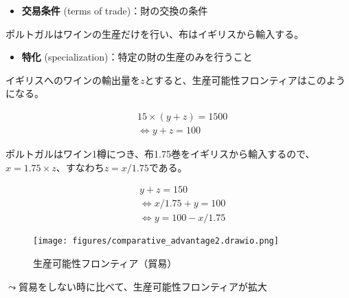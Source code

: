 \documentclass[
  xelatex,
  ja=standard]{bxjsarticle}
\providecommand{\tightlist}{%
  \setlength{\itemsep}{0pt}\setlength{\parskip}{0pt}}\usepackage{longtable,booktabs,array}
\begin{document}
\begin{itemize}
\tightlist
\item
  \textbf{交易条件} (terms of trade)：財の交換の条件
\end{itemize}

\begin{tcolorbox}[enhanced jigsaw, left=2mm, colframe=quarto-callout-tip-color-frame, colback=white, coltitle=black, rightrule=.15mm, title=\textcolor{quarto-callout-tip-color}{\faLightbulb}\hspace{0.5em}{イギリスとポルトガルの貿易'\,'\,'}, arc=.35mm, toprule=.15mm, bottomrule=.15mm, leftrule=.75mm, bottomtitle=1mm, toptitle=1mm, titlerule=0mm, breakable, opacitybacktitle=0.6, colbacktitle=quarto-callout-tip-color!10!white, opacityback=0]

ポルトガルはワインの生産だけを行い、布はイギリスから輸入する。

\end{tcolorbox}

\begin{itemize}
\tightlist
\item
  \textbf{特化} (specialization)：特定の財の生産のみを行うこと
\end{itemize}

イギリスへのワインの輸出量を\(z\)とすると、生産可能性フロンティアはこのようになる。

\[
\begin{split}
& 15 \times (y + z) = 1500 \\
& \Leftrightarrow y + z = 100
\end{split}
\]

ポルトガルはワイン1樽につき、布1.75巻をイギリスから輸入するので、\(x = 1.75 \times z\)、すなわち\(z = x/1.75\)である。

\[
\begin{split}
& y + z = 150 \\
& \Leftrightarrow x/1.75 + y = 100 \\
& \Leftrightarrow y = 100 - x/1.75
\end{split}
\]

\begin{figure}[htpb]

{\centering \texttt{[image: figures/comparative\_advantage2.drawio.png]}

}

\caption{生産可能性フロンティア（貿易）}

\end{figure}

\(\leadsto\)貿易をしない時に比べて、生産可能性フロンティアが拡大
\end{document}

